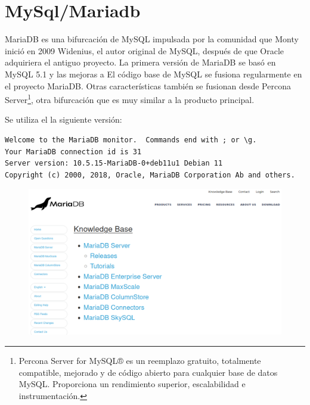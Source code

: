 \chapter{MySql/Mariadb}
MariaDB es una bifurcación de MySQL impulsada por la comunidad que Monty inició en 2009 Widenius, el autor original de MySQL, después de que Oracle adquiriera el antiguo proyecto.
La primera versión de MariaDB se basó en MySQL 5.1 y las mejoras a El código base de MySQL se fusiona regularmente en el proyecto MariaDB. Otras características
también se fusionan desde Percona Server\footnote{Percona Server for MySQL® es un reemplazo gratuito, totalmente compatible, mejorado y de código abierto para cualquier base de datos MySQL. Proporciona un rendimiento superior, escalabilidad e instrumentación.}, otra bifurcación que es muy similar a la producto principal.

Se utiliza el la siguiente versión:
\begin{verbatim}
Welcome to the MariaDB monitor.  Commands end with ; or \g.
Your MariaDB connection id is 31
Server version: 10.5.15-MariaDB-0+deb11u1 Debian 11
Copyright (c) 2000, 2018, Oracle, MariaDB Corporation Ab and others.
\end{verbatim}

\begin{figure}[h]
\includegraphics[scale=0.5]{images/maria1}
\end{figure}

